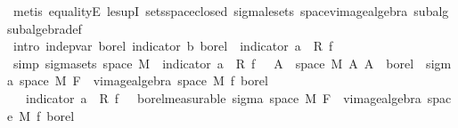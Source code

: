 \begin{isabellebody}
\ {\isacharparenleft}{\kern0pt}metis\ equalityE\ le{\isacharunderscore}{\kern0pt}supI\ sets{\isachardot}{\kern0pt}space{\isacharunderscore}{\kern0pt}closed\ sigma{\isacharunderscore}{\kern0pt}le{\isacharunderscore}{\kern0pt}sets\ space{\isacharunderscore}{\kern0pt}vimage{\isacharunderscore}{\kern0pt}algebra\ subalg\ subalgebra{\isacharunderscore}{\kern0pt}def{\isacharparenright}{\kern0pt}\isanewline
\isanewline
\ \ \ \ \ \ \isamarkupfalse%
\ {\isacharbrackleft}{\kern0pt}intro{\isacharbrackright}{\kern0pt}{\isacharcolon}{\kern0pt}\ {\isachardoublequoteopen}indep{\isacharunderscore}{\kern0pt}var\ borel\ {\isacharparenleft}{\kern0pt}indicator\ b{\isacharparenright}{\kern0pt}\ borel\ {\isacharparenleft}{\kern0pt}{\isasymlambda}{\isasymomega}{\isachardot}{\kern0pt}\ indicator\ a\ {\isasymomega}\ {\isacharasterisk}{\kern0pt}\isactrlsub R\ f\ {\isasymomega}{\isacharparenright}{\kern0pt}{\isachardoublequoteclose}\isanewline
\ \ \ \ \ \ \isamarkupfalse%
\ {\isacharminus}{\kern0pt}\isanewline
\ \ \ \ \ \ \ \ \isamarkupfalse%
\ {\isacharbrackleft}{\kern0pt}simp{\isacharbrackright}{\kern0pt}{\isacharcolon}{\kern0pt}\ {\isachardoublequoteopen}sigma{\isacharunderscore}{\kern0pt}sets\ {\isacharparenleft}{\kern0pt}space\ M{\isacharparenright}{\kern0pt}\ {\isacharbraceleft}{\kern0pt}{\isacharparenleft}{\kern0pt}{\isasymlambda}{\isasymomega}{\isachardot}{\kern0pt}\ indicator\ a\ {\isasymomega}\ {\isacharasterisk}{\kern0pt}\isactrlsub R\ f\ {\isasymomega}{\isacharparenright}{\kern0pt}\ {\isacharminus}{\kern0pt}{\isacharbackquote}{\kern0pt}\ A\ {\isasyminter}\ space\ M\ {\isacharbar}{\kern0pt}A{\isachardot}{\kern0pt}\ A\ {\isasymin}\ borel{\isacharbraceright}{\kern0pt}\ {\isasymsubseteq}\ sigma\ {\isacharparenleft}{\kern0pt}space\ M{\isacharparenright}{\kern0pt}\ {\isacharparenleft}{\kern0pt}F\ {\isasymunion}\ vimage{\isacharunderscore}{\kern0pt}algebra\ {\isacharparenleft}{\kern0pt}space\ M{\isacharparenright}{\kern0pt}\ f\ borel{\isacharparenright}{\kern0pt}{\isachardoublequoteclose}\isanewline
\ \ \ \ \ \ \ \ \isamarkupfalse%
\ {\isacharminus}{\kern0pt}\isanewline
\ \ \ \ \ \ \ \ \ \ \isamarkupfalse%
\ {\isacharasterisk}{\kern0pt}{\isacharcolon}{\kern0pt}\ {\isachardoublequoteopen}{\isacharparenleft}{\kern0pt}{\isasymlambda}{\isasymomega}{\isachardot}{\kern0pt}\ indicator\ a\ {\isasymomega}\ {\isacharasterisk}{\kern0pt}\isactrlsub R\ f\ {\isasymomega}{\isacharparenright}{\kern0pt}\ {\isasymin}\ borel{\isacharunderscore}{\kern0pt}measurable\ {\isacharparenleft}{\kern0pt}sigma\ {\isacharparenleft}{\kern0pt}space\ M{\isacharparenright}{\kern0pt}\ {\isacharparenleft}{\kern0pt}F\ {\isasymunion}\ vimage{\isacharunderscore}{\kern0pt}algebra\ {\isacharparenleft}{\kern0pt}space\ M{\isacharparenright}{\kern0pt}\ f\ borel{\isacharparenright}{\kern0pt}{\isacharparenright}{\kern0pt}{\isachardoublequoteclose}\isanewline

\end{isabellebody}
